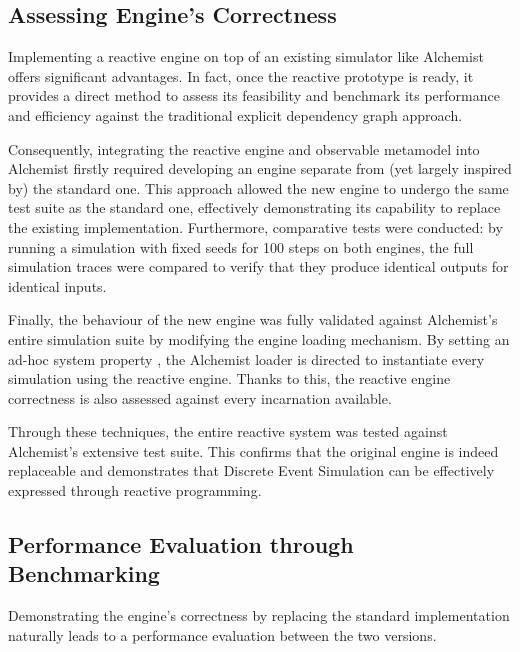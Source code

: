 \subsection{Assessing Engine's Correctness}
Implementing a reactive engine on top of an existing simulator like Alchemist
offers significant advantages. In fact, once the reactive prototype is ready,
it provides a direct method to assess its feasibility and benchmark its
performance and efficiency against the traditional explicit dependency graph
approach.

Consequently, integrating the reactive engine and observable metamodel into
Alchemist firstly required developing an engine separate from (yet largely
inspired by) the standard one. This approach allowed the new engine to undergo
the same test suite as the standard one, effectively demonstrating its
capability to replace the existing implementation. Furthermore, comparative
tests were conducted: by running a simulation with fixed seeds for 100 steps on
both engines, the full simulation traces were compared to verify that they
produce identical outputs for identical inputs.

Finally, the behaviour of the new engine was fully validated against
Alchemist's entire simulation suite by modifying the engine loading mechanism.
By setting an ad-hoc system property ,
the Alchemist loader is directed to instantiate every simulation using the
reactive engine. Thanks to this, the reactive engine correctness is also
assessed against every incarnation available.

Through these techniques, the entire reactive system was tested against
Alchemist's extensive test suite. This confirms that the original engine is
indeed replaceable and demonstrates that Discrete Event Simulation can be
effectively expressed through reactive programming.

\subsection{Performance Evaluation through Benchmarking}\label{ssec:benchmark}
Demonstrating the engine's correctness by replacing the standard implementation
naturally leads to a performance evaluation between the two versions.

